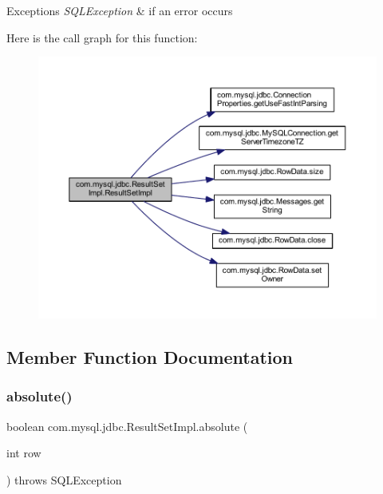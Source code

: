 \begin{DoxyExceptions}{Exceptions}
{\em S\+Q\+L\+Exception} & if an error occurs \\
\hline
\end{DoxyExceptions}
Here is the call graph for this function\+:
\nopagebreak
\begin{figure}[H]
\begin{center}
\leavevmode
\includegraphics[width=350pt]{classcom_1_1mysql_1_1jdbc_1_1_result_set_impl_a6e4a9d2710dcc61d476408d2cf4fe52c_cgraph}
\end{center}
\end{figure}


\subsection{Member Function Documentation}
\mbox{\label{classcom_1_1mysql_1_1jdbc_1_1_result_set_impl_a780c371204d84b09d2bdcd86a1a67ac3}} 
\subsubsection{\texorpdfstring{absolute()}{absolute()}}
{\footnotesize\ttfamily boolean com.\+mysql.\+jdbc.\+Result\+Set\+Impl.\+absolute (\begin{DoxyParamCaption}\item[{int}]{row }\end{DoxyParamCaption}) throws S\+Q\+L\+Exception}

